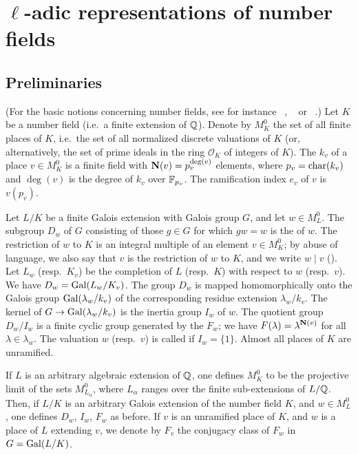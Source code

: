 \section{\texorpdfstring{$\ell$}{ℓ}-adic representations of number fields}
\label{sec:I_2}

\subsection{Preliminaries}%
\label{sec:I_21}
(For the basic notions concerning number fields, see for instance
\citeauthor{6}~\cite{6}, \citeauthor{13}~\cite{13} or
\citeauthor{44}~\cite{44}.)
Let $K$ be a number field (i.e.\ a finite extension of $\mathbb{Q}$). Denote by $M_K^0$
the set of all finite places of $K$, i.e.\, the set of all normalized discrete
valuations of $K$ (or, alternatively, the set of prime ideals in the ring
$\mathcal{O}_K$ of integers of $K$).
The  $k_v$ of a place $v \in M_K^0$
is a finite field with $\operatorname{\mathbf{N}}(v) = p_v^{\deg(v)}$ elements, where
\dpage
$p_v = \operatorname{char}(k_v)$ and $\deg(v)$ is the degree of $k_v$ over $\mathbb{F}_{p_v}$. The
ramification index $e_v$ of $v$ is $v(p_v)$.

Let $L/K$ be a finite Galois extension with Galois group $G$,
and let $w \in M_L^0$.
The subgroup $D_w$ of $G$ consisting of those $g \in G$ for which $gw = w$ is
the  of $w$.
The restriction of $w$ to $K$ is an integral multiple of an element $v \in
M_K^0$; by abuse of language, we also say that $v$ is the restriction of $w$ to
$K$, and we write $w \mid v$ ().
Let $L_w$ (resp.\ $K_v$) be the completion of $L$ (resp.\ $K$) with respect to $w$
(resp.\ $v$). We have $D_w = \operatorname{Gal}(L_w/K_v)$. The group $D_w$ is mapped
homomorphically onto the Galois group $\operatorname{Gal}(\lambda_w/k_v)$ of the corresponding
residue extension $\lambda_w/k_v$. The kernel of $G \to \operatorname{Gal}(\lambda_w/k_v)$ is
the inertia group $I_w$ of $w$. The quotient group $D_w/I_w$ is a finite cyclic
group generated by the 
$F_w$; we have $F(\lambda) = \lambda^{\operatorname{\mathbf{N}}(v)}$ for all $\lambda \in
\lambda_w$.
The valuation $w$ (resp.\ $v$) is called  if $I_w = \{ 1 \}$.
Almost all places of $K$ are unramified.

If $L$ is an arbitrary algebraic extension of $\mathbb{Q}$, one defines $M_K^0$ to be
the projective limit of the sets $M_{L_\alpha}^0$, where $L_\alpha$ ranges
over the finite sub-extensions of $L/\mathbb{Q}$. Then, if $L/K$ is an 
arbitrary Galois extension of the number field $K$, and $w \in M_L^0$, one
defines $D_w$, $I_w$, $F_w$ as before. If $v$ is an unramified place of $K$,
and $w$ is a place of $L$ extending $v$, we denote by $F_v$ the conjugacy
class of $F_w$ in $G = \operatorname{Gal}(L/K)$.

